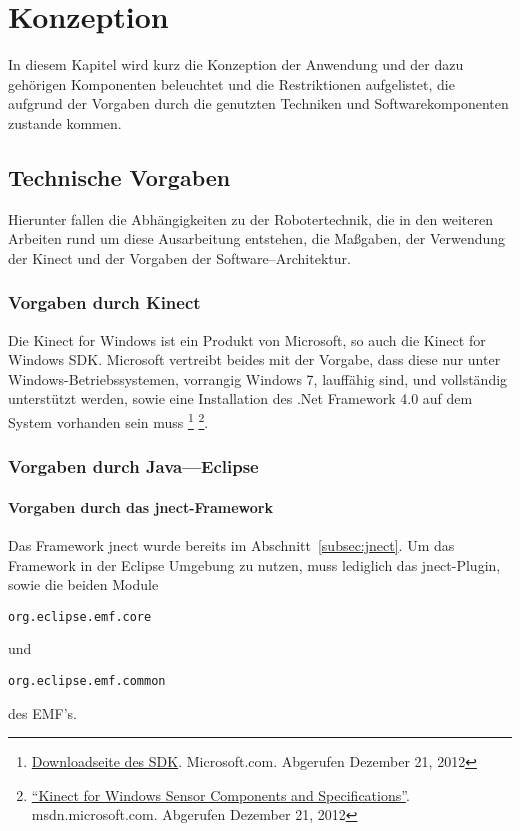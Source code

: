 \chapter{Konzeption}
\label{chap:Konzeption}

In diesem Kapitel wird kurz die Konzeption der Anwendung und der dazu geh\"origen Komponenten beleuchtet und die Restriktionen aufgelistet, die aufgrund der Vorgaben durch die genutzten Techniken und Softwarekomponenten zustande kommen.

\section{Technische Vorgaben}
Hierunter fallen die Abh\"angigkeiten zu der Robotertechnik, die in den weiteren Arbeiten rund um diese Ausarbeitung entstehen, die Ma\ss gaben, der Verwendung der Kinect und der Vorgaben der Software--Architektur.

\subsection{Vorgaben durch Kinect}
Die Kinect for Windows ist ein Produkt von Microsoft, so auch die Kinect for Windows \acrshort{SDK}. Microsoft vertreibt beides mit der Vorgabe, dass diese nur unter Windows-Betriebssystemen, vorrangig Windows 7, lauff\"ahig sind, und vollst\"andig unterst\"utzt werden, sowie eine Installation des .Net Framework 4.0 auf dem System vorhanden sein muss \footnote{\href{https://www.microsoft.com/en-us/kinectforwindows/develop/}{Downloadseite des SDK}. Microsoft.com. Abgerufen Dezember 21, 2012} \footnote{\href{http://msdn.microsoft.com/en-us/library/jj131033.aspx}{\enquote{Kinect for Windows Sensor Components and Specifications}}. msdn.microsoft.com. Abgerufen Dezember 21, 2012}.

\subsection{Vorgaben durch Java---Eclipse}

\subsubsection{Vorgaben durch das jnect-Framework}
Das Framework jnect wurde bereits im Abschnitt~\ref{subsec:jnect}. Um das \gls{Framework} in der Eclipse Umgebung zu nutzen, muss lediglich das jnect-Plugin, sowie die beiden Module \begin{verbatim}org.eclipse.emf.core\end{verbatim} und \begin{verbatim}org.eclipse.emf.common\end{verbatim} des \gls{EMF}'s.


